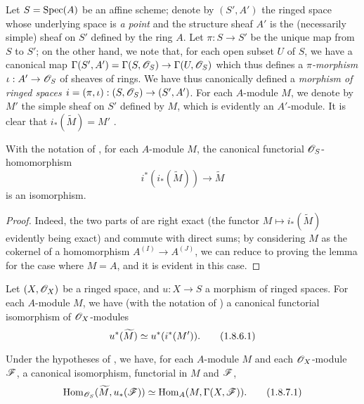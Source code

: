 \begin{env}[1.8.4]
\label{I.1.8.4}
Let $S=\operatorname{Spec}(A)$ be an affine scheme;
denote by $(S',A')$ the ringed space whose underlying space is \emph{a point} and the structure sheaf $A'$ is the (necessarily simple) sheaf on $S'$ defined by the ring $A$.
Let $\pi:S\to S'$ be the unique map from $S$ to $S'$;
on the other hand, we note that, for each open subset $U$ of $S$, we have a canonical map $\Gamma(S',A')=\Gamma(S,\sh{O}_S)\to\Gamma(U,\sh{O}_S)$ which thus defines a \emph{$\pi$-morphism} $\iota:A'\to\sh{O}_S$ of sheaves of rings.
We have thus canonically defined a \emph{morphism of ringed spaces $i=(\pi,\iota):(S,\sh{O}_S)\to(S',A')$}.
For each $A$-module $M$, we denote by $M'$ the simple sheaf on $S'$ defined by $M$, which is evidently an $A'$-module.
It is clear that $i_*(\widetilde{M})=M'$ .
\end{env}

\begin{lemma}[1.8.5]
\label{I.1.8.5}
With the notation of , for each $A$-module $M$, the canonical functorial $\mathscr{O}_S$-homomorphism 
\[
\label{I.1.8.5.1}
  i^*(i_*(\widetilde{M}))\to\widetilde{M}
  \tag{1.8.5.1}
\]
is an isomorphism.
\end{lemma}

\begin{proof}
Indeed, the two parts of  are right exact (the functor $M\mapsto i_*(\widetilde{M})$ evidently being exact) and commute with direct sums;
by considering $M$ as the cokernel of a homomorphism $A^{(I)}\to A^{(J)}$, we can reduce to proving the lemma for the case where $M=A$, and it is evident in this case.
\end{proof}

\begin{corollary}[1.8.6]
\label{I.1.8.6}
Let $(X,\mathscr{O}_X)$ be a ringed space, and $u:X\to S$ a morphism of ringed spaces.
For each $A$-module $M$, we have (with the notation of ) a canonical functorial isomorphism of $\mathscr{O}_X$-modules
\[
\label{I.1.8.6.1}
  u^*(\widetilde{M})\simeq u^*(i^*(M')).
  \tag{1.8.6.1}
\]
\end{corollary}

\begin{corollary}[1.8.7]
\label{I.1.8.7}
Under the hypotheses of , we have, for each $A$-module $M$ and each $\mathscr{O}_X$-module $\mathscr{F}$, a canonical isomorphism, functorial in $M$ and $\mathscr{F}$,
\[
\label{I.1.8.7.1}
  \operatorname{Hom}_{\mathscr{O}_S}(\widetilde{M},u_*(\mathscr{F}))\simeq\operatorname{Hom}_A(M,\Gamma(X,\mathscr{F})).
  \tag{1.8.7.1}
\]
\end{corollary}

